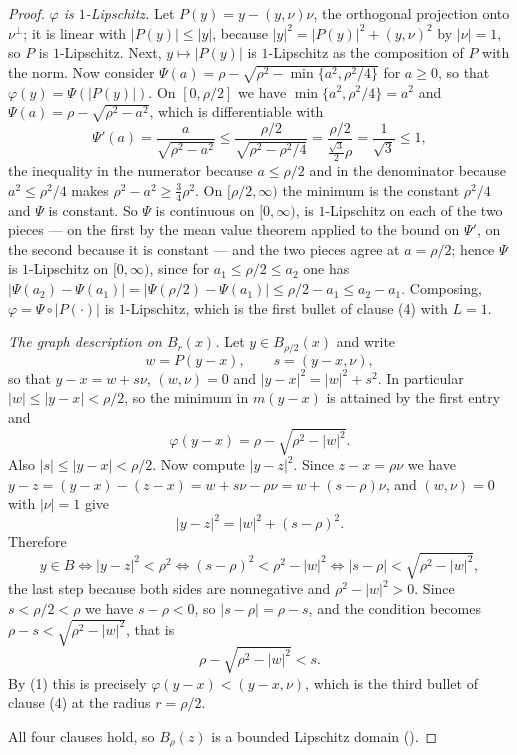 \begin{proof}
\emph{$\varphi$ is $1$-Lipschitz.}  Let $P(y)=y-(y,\nu)\nu$, the orthogonal
projection onto $\nu^{\perp}$; it is linear with $|P(y)|\le|y|$, because
$|y|^2=|P(y)|^2+(y,\nu)^2$ by $|\nu|=1$, so $P$ is $1$-Lipschitz.  Next,
$y\mapsto|P(y)|$ is $1$-Lipschitz as the composition of $P$ with the norm.  Now
consider $\Psi(a)=\rho-\sqrt{\rho^2-\min\{a^2,\rho^2/4\}}$ for $a\ge0$, so that
$\varphi(y)=\Psi(|P(y)|)$.  On $[0,\rho/2]$ we have $\min\{a^2,\rho^2/4\}=a^2$
and $\Psi(a)=\rho-\sqrt{\rho^2-a^2}$, which is differentiable with
\[
\Psi'(a)=\frac a{\sqrt{\rho^2-a^2}}
\le\frac{\rho/2}{\sqrt{\rho^2-\rho^2/4}}
=\frac{\rho/2}{\tfrac{\sqrt3}2\rho}=\frac1{\sqrt3}\le1 ,
\]
the inequality in the numerator because $a\le\rho/2$ and in the denominator
because $a^2\le\rho^2/4$ makes $\rho^2-a^2\ge\tfrac34\rho^2$.  On
$[\rho/2,\infty)$ the minimum is the constant $\rho^2/4$ and $\Psi$ is constant.
So $\Psi$ is continuous on $[0,\infty)$, is $1$-Lipschitz on each of the two
pieces --- on the first by the mean value theorem applied to the bound on
$\Psi'$, on the second because it is constant --- and the two pieces agree at
$a=\rho/2$; hence $\Psi$ is $1$-Lipschitz on $[0,\infty)$, since for
$a_1\le\rho/2\le a_2$ one has
$|\Psi(a_2)-\Psi(a_1)|=|\Psi(\rho/2)-\Psi(a_1)|\le\rho/2-a_1\le a_2-a_1$.
Composing, $\varphi=\Psi\circ|P(\cdot)|$ is $1$-Lipschitz, which is the first
bullet of clause (4) with $L=1$.

\emph{The graph description on $B_r(x)$.}  Let $y\in B_{\rho/2}(x)$ and write
\[
w=P(y-x),
\qquad
s=(y-x,\nu),
\]
so that $y-x=w+s\nu$, $(w,\nu)=0$ and $|y-x|^2=|w|^2+s^2$.  In particular
$|w|\le|y-x|<\rho/2$, so the minimum in $m(y-x)$ is attained by the first
entry and
\[
\varphi(y-x)=\rho-\sqrt{\rho^2-|w|^2} .
\tag{1}
\]
Also $|s|\le|y-x|<\rho/2$.  Now compute $|y-z|^2$.  Since
$z-x=\rho\nu$ we have $y-z=(y-x)-(z-x)=w+s\nu-\rho\nu=w+(s-\rho)\nu$, and
$(w,\nu)=0$ with $|\nu|=1$ give
\[
|y-z|^2=|w|^2+(s-\rho)^2 .
\]
Therefore
\[
y\in B
\iff |y-z|^2<\rho^2
\iff (s-\rho)^2<\rho^2-|w|^2
\iff |s-\rho|<\sqrt{\rho^2-|w|^2},
\]
the last step because both sides are nonnegative and $\rho^2-|w|^2>0$.  Since
$s<\rho/2<\rho$ we have $s-\rho<0$, so $|s-\rho|=\rho-s$, and the condition
becomes $\rho-s<\sqrt{\rho^2-|w|^2}$, that is
\[
\rho-\sqrt{\rho^2-|w|^2}<s .
\]
By (1) this is precisely $\varphi(y-x)<(y-x,\nu)$, which is the third bullet of
clause (4) at the radius $r=\rho/2$.

All four clauses hold, so $B_\rho(z)$ is a bounded Lipschitz domain
().
\end{proof}
